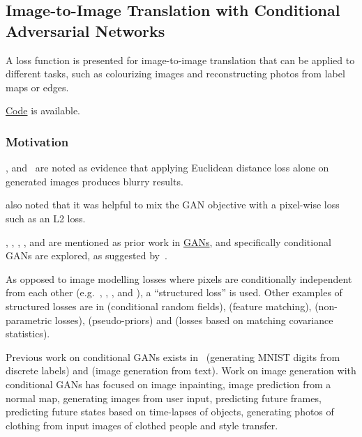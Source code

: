 \documentclass[a4paper, 12pt]{article}
\begin{document}
\subsection{Image-to-Image Translation with Conditional Adversarial
            Networks\citet{DBLP:journals/corr/IsolaZZE16}}

A loss function is presented for image-to-image translation that can be applied
to different tasks, such as colourizing images and reconstructing photos from
label maps or edges.

\href{https://github.com/phillipi/pix2pix}{Code} is available.

\subsubsection{Motivation}

\citet{DBLP:journals/corr/LarsenSW15}, \citet{DBLP:journals/corr/PathakKDDE16}
and~\citet{DBLP:journals/corr/ZhangIE16} are noted as evidence that applying
Euclidean distance loss alone on generated images produces blurry results.

\citet{DBLP:journals/corr/PathakKDDE16} also noted that it was helpful to mix
the GAN objective with a pixel-wise loss such as an L2 loss.

\citet{NIPS2014_5423}, \citet{DBLP:journals/corr/DentonCSF15},
\citet{DBLP:journals/corr/RadfordMC15},
\citet{DBLP:journals/corr/SalimansGZCRC16}, and
\citet{DBLP:journals/corr/ZhaoML16} are mentioned as prior work in
\hyperref[gan]{GANs}, and specifically conditional GANs are explored, as
suggested by~\citet{NIPS2014_5423}.

As opposed to image modelling losses where pixels are conditionally independent
from each other (e.g.~\citet{DBLP:journals/corr/ShelhamerLD16},
\citet{DBLP:journals/corr/XieT15}, \citet{IizukaSIGGRAPH2016},
\citet{DBLP:journals/corr/LarssonMS16} and \citet{DBLP:journals/corr/ZhangIE16}),
a ``structured loss'' is used. Other examples of structured losses are in
\citet{DBLP:journals/corr/ChenPKMY14} (conditional random fields),
\citet{DBLP:journals/corr/DosovitskiyB16} (feature matching),
\citet{DBLP:journals/corr/LiW16} (non-parametric losses),
\citet{DBLP:journals/corr/XieHT15} (pseudo-priors) and
\citet{DBLP:journals/corr/JohnsonAL16} (losses based on matching covariance
statistics).

Previous work on conditional GANs exists in~\citet{DBLP:journals/corr/MirzaO14}
(generating MNIST digits from discrete labels) and
\citet{DBLP:journals/corr/ReedAYLSL16} (image generation from text). Work on
image generation with conditional GANs has focused on image
inpainting\citet{DBLP:journals/corr/PathakKDDE16}, image prediction from a
normal map\citet{DBLP:journals/corr/WangG16}, generating images from user
input\citet{DBLP:journals/corr/WangG16}, predicting future
frames\citet{DBLP:journals/corr/MathieuCL15}, predicting future states based on
time-lapses of objects\citet{DBLP:journals/corr/ZhouB16b}, generating photos of
clothing from input images of clothed people\citet{DBLP:journals/corr/YooKPPK16}
and style transfer\citet{DBLP:journals/corr/LiW16b}.
\end{document}
